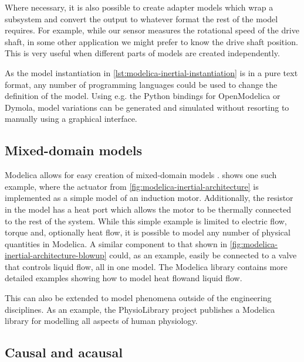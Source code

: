 \documentclass[\rootfolder/main.tex]{subfiles}
\begin{document}
Where necessary, it is also possible to create adapter models which wrap a subsystem and convert the output to whatever format the rest of the model requires.
For example, while our sensor measures the rotational speed of the drive shaft, in some other application we might prefer to know the drive shaft position.
This is very useful when different parts of models are created independently.

As the model instantiation in \cref{lst:modelica-inertial-instantiation} is in a pure text format, any number of programming languages could be used to change the definition of the model.
Using e.g. the Python bindings for OpenModelica or Dymola, model variations can be generated and simulated without resorting to manually using a graphical interface.

\subsection{Mixed-domain models}

Modelica allows for easy creation of mixed-domain models \cite{clauss2002}.
 shows one such example, where the actuator from \cref{fig:modelica-inertial-architecture} is implemented as a simple model of an induction motor.
Additionally, the resistor in the model has a heat port which allows the motor to be thermally connected to the rest of the system.
While this simple example is limited to electric flow, torque and, optionally heat flow, it is possible to model any number of physical quantities in Modelica.
A similar component to that shown in \cref{fig:modelica-inertial-architecture-blowup} could, as an example, easily be connected to a valve that controls liquid flow, all in one model.
The Modelica library contains more detailed examples showing how to model heat flow\footnotemark and liquid flow\footnotemark.


This can also be extended to model phenomena outside of the engineering disciplines.
As an example, the PhysioLibrary project publishes a Modelica library for modelling all aspects of human physiology.

\subsection{Causal and acausal}
\end{document}
